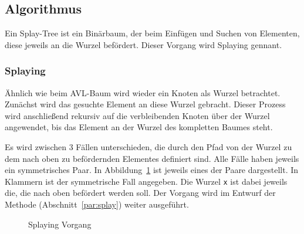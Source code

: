 \subsection{Algorithmus}\label{subsec:splay-algorithmus}
Ein Splay-Tree ist ein Binärbaum, der beim Einfügen und Suchen von Elementen, diese jeweils an
die Wurzel befördert.
Dieser Vorgang wird Splaying gennant.

\subsubsection{Splaying}
Ähnlich wie beim AVL-Baum wird wieder ein Knoten als Wurzel betrachtet.
Zunächst wird das gesuchte Element an diese Wurzel gebracht.
Dieser Prozess wird anschließend rekursiv auf die verbleibenden Knoten über der Wurzel angewendet,
bis das Element an der Wurzel des kompletten Baumes steht.

Es wird zwischen 3 Fällen unterschieden, die durch den Pfad von der Wurzel zu dem nach oben
zu befördernden Elementes definiert sind.
Alle Fälle haben jeweils ein symmetrisches Paar.
In Abbildung~\ref{fig:splayinCase} ist jeweils eines der Paare dargestellt.
In Klammern ist der symmetrische Fall angegeben.
Die Wurzel \verb|x| ist dabei jeweils die, die nach oben befördert werden soll.
Der Vorgang wird im Entwurf der Methode  (Abschnitt~\ref{par:splay})
weiter ausgeführt.

\begin{figure}[hbt]
    \centering
    \qquad
    \qquad
    \caption{Splaying Vorgang}\label{fig:splayinCase}
\end{figure}

